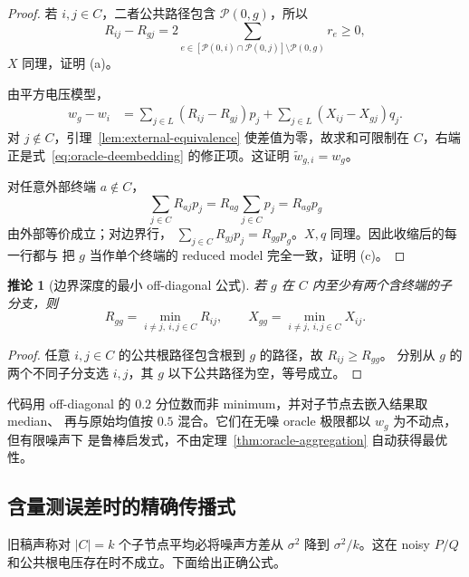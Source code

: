 \documentclass[UTF8,11pt]{ctexart}
\newtheorem{corollary}[definition]{推论}
\newcommand{\pathset}{\mathcal P}
\begin{document}
\begin{proof}
若 $i,j\in C$，二者公共路径包含 $\pathset(0,g)$，所以
\begin{equation*}
 R_{ij}-R_{gj}
 =2\sum_{e\in[\pathset(0,i)\cap\pathset(0,j)]\setminus\pathset(0,g)}r_e\ge0,
\end{equation*}
$X$ 同理，证明 (a)。

由平方电压模型，
\begin{align*}
 w_g-w_i
 &=\sum_{j\in L}(R_{ij}-R_{gj})p_j
 +\sum_{j\in L}(X_{ij}-X_{gj})q_j.
\end{align*}
对 $j\notin C$，引理~\ref{lem:external-equivalence} 使差值为零，故求和可限制在
$C$，右端正是式~\eqref{eq:oracle-deembedding} 的修正项。这证明
$\widetilde w_{g,i}=w_g$。

对任意外部终端 $a\notin C$，
\begin{equation*}
 \sum_{j\in C}R_{aj}p_j=R_{ag}\sum_{j\in C}p_j=R_{ag}p_g
\end{equation*}
由外部等价成立；对边界行，
$\sum_{j\in C}R_{gj}p_j=R_{gg}p_g$。$X,q$ 同理。因此收缩后的每一行都与
把 $g$ 当作单个终端的 reduced model 完全一致，证明 (c)。
\end{proof}

\begin{corollary}[边界深度的最小 off-diagonal 公式]
\label{cor:boundary-depth}
若 $g$ 在 $C$ 内至少有两个含终端的子分支，则
\begin{equation}
 R_{gg}=\min_{i\ne j,\ i,j\in C}R_{ij},
 \qquad
 X_{gg}=\min_{i\ne j,\ i,j\in C}X_{ij}.
 \label{eq:min-offdiag}
\end{equation}
\end{corollary}

\begin{proof}
任意 $i,j\in C$ 的公共根路径包含根到 $g$ 的路径，故 $R_{ij}\ge R_{gg}$。
分别从 $g$ 的两个不同子分支选 $i,j$，其 $g$ 以下公共路径为空，等号成立。
\end{proof}

代码用 off-diagonal 的 $0.2$ 分位数而非 minimum，并对子节点去嵌入结果取 median、
再与原始均值按 $0.5$ 混合。它们在无噪 oracle 极限都以 $w_g$ 为不动点，但有限噪声下
是鲁棒启发式，不由定理~\ref{thm:oracle-aggregation} 自动获得最优性。

\subsection{含量测误差时的精确传播式}

旧稿声称对 $|C|=k$ 个子节点平均必将噪声方差从 $\sigma^2$ 降到
$\sigma^2/k$。这在 noisy $P/Q$ 和公共根电压存在时不成立。下面给出正确公式。
\end{document}
